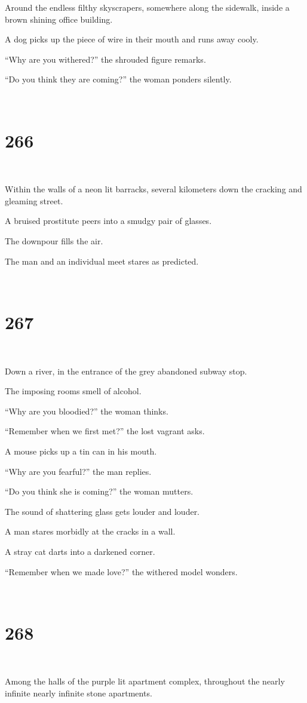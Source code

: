 \documentclass{report}
\begin{document}
Around the endless filthy skyscrapers, somewhere along the sidewalk, inside a brown shining office building.

A dog picks up the piece of wire in their mouth and runs away cooly.

``Why are you withered?'' the shrouded figure remarks.

``Do you think they are coming?'' the woman ponders silently.

~
\chapter*{266}
~

Within the walls of a neon lit barracks, several kilometers down the cracking and gleaming street.

A bruised prostitute peers into a smudgy pair of glasses.

The downpour fills the air.

The man and an individual meet stares as predicted.

~
\chapter*{267}
~

Down a river, in the entrance of the grey abandoned subway stop.

The imposing rooms smell of alcohol.

``Why are you bloodied?'' the woman thinks.

``Remember when we first met?'' the lost vagrant asks.

A mouse picks up a tin can in his mouth.

``Why are you fearful?'' the man replies.

``Do you think she is coming?'' the woman mutters.

The sound of shattering glass gets louder and louder.

A man stares morbidly at the cracks in a wall.

A stray cat darts into a darkened corner.

``Remember when we made love?'' the withered model wonders.

~
\chapter*{268}
~

Among the halls of the purple lit apartment complex, throughout the nearly infinite nearly infinite stone apartments.
\end{document}
